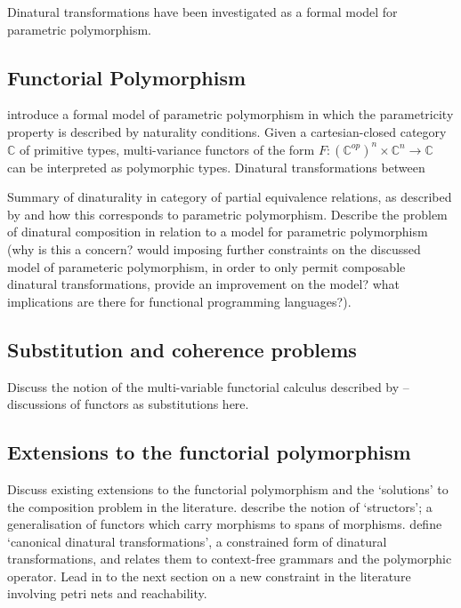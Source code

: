 \documentclass[../../Dissertation.tex]{subfiles}
\begin{document}
Dinatural transformations have been investigated as a formal model for parametric polymorphism.

\subsection{Functorial Polymorphism}
 introduce a formal model of parametric polymorphism in which the parametricity property is described by naturality conditions. Given a cartesian-closed category $\mathbb{C}$ of primitive types, multi-variance functors of the form $F : (\mathbb{C}^{op})^n \times \mathbb{C}^n \rightarrow \mathbb{C}$ can be interpreted as polymorphic types. Dinatural transformations between

Summary of dinaturality in category of partial equivalence relations, as described by  and how this corresponds to parametric polymorphism.
\newline\newline
Describe the problem of dinatural composition in relation to a model for parametric polymorphism (why is this a concern? would imposing further constraints on the discussed model of parameteric polymorphism, in order to only permit composable dinatural transformations, provide an improvement on the model? what implications are there for functional programming languages?).

\subsection{Substitution and coherence problems}
Discuss the notion of the multi-variable functorial calculus described by  -- discussions of functors as substitutions here.

\subsection{Extensions to the functorial polymorphism}
Discuss existing extensions to the functorial polymorphism and the `solutions' to the composition problem in the literature.
\newline\newline
{} describe the notion of `structors'; a generalisation of functors which carry morphisms to spans of morphisms.
\newline\newline
{} define `canonical dinatural transformations', a constrained form of dinatural transformations, and relates them to context-free grammars and the polymorphic operator.
\newline\newline
Lead in to the next section on a new constraint in the literature involving petri nets and reachability.
\end{document}
